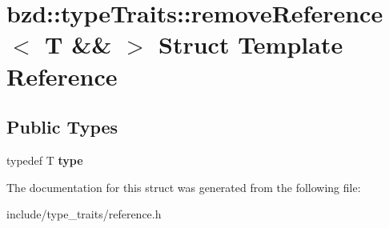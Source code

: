 \hypertarget{structbzd_1_1typeTraits_1_1removeReference_3_01T_01_6_6_01_4}{}\section{bzd\+:\+:type\+Traits\+:\+:remove\+Reference$<$ T \&\& $>$ Struct Template Reference}
\label{structbzd_1_1typeTraits_1_1removeReference_3_01T_01_6_6_01_4}
\subsection*{Public Types}
\begin{DoxyCompactItemize}
\item 
\mbox{\label{structbzd_1_1typeTraits_1_1removeReference_3_01T_01_6_6_01_4_a76881c733571f37fa26645a2891f19b7}} 
typedef T {\bfseries type}
\end{DoxyCompactItemize}


The documentation for this struct was generated from the following file\+:\begin{DoxyCompactItemize}
\item 
include/type\+\_\+traits/reference.\+h\end{DoxyCompactItemize}

